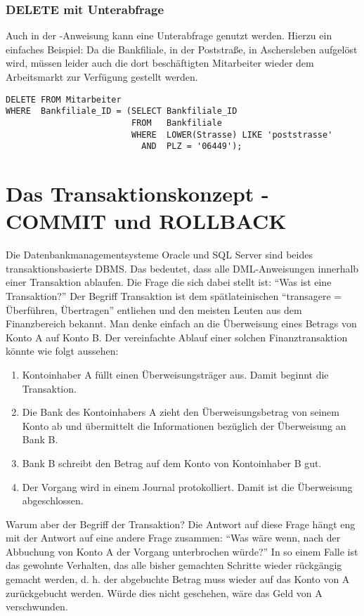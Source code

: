         \subsubsection{DELETE mit Unterabfrage}
         Auch in der \DELETE-Anweisung kann eine Unterabfrage genutzt werden.
         Hierzu ein einfaches Beispiel: Da die Bankfiliale, in der
         Poststraße, in Aschersleben aufgelöst wird, müssen leider auch
         die dort beschäftigten Mitarbeiter wieder dem Arbeitsmarkt zur
         Verfügung gestellt werden.
          \begin{lstlisting}[language=oracle_sql,caption={\DELETE{} mit Unterabfrage},label=sql07_22]
DELETE FROM Mitarbeiter
WHERE  Bankfiliale_ID = (SELECT Bankfiliale_ID
                         FROM   Bankfiliale
                         WHERE  LOWER(Strasse) LIKE 'poststrasse'
                           AND  PLZ = '06449');
          \end{lstlisting}
    \section{Das Transaktionskonzept - COMMIT und ROLLBACK}
      Die Datenbankmanagementsysteme Oracle und SQL Server sind beides
      transaktionsbasierte DBMS. Das bedeutet, dass alle DML-Anweisungen
      innerhalb einer Transaktion ablaufen. Die Frage die sich dabei stellt ist:
      \enquote{Was ist eine Transaktion?} Der Begriff Transaktion ist dem
      spätlateinischen \enquote{transagere = Überführen, Übertragen}
      entliehen und den meisten Leuten aus dem Finanzbereich bekannt. Man denke
      einfach an die Überweisung eines Betrags von Konto A auf Konto B. Der
      vereinfachte Ablauf einer solchen Finanztransaktion könnte wie folgt
      aussehen:
      \begin{enumerate}
        \item Kontoinhaber A füllt einen Überweisungsträger aus. Damit
        beginnt die Transaktion.
        \item Die Bank des Kontoinhabers A zieht den Überweisungsbetrag von
        seinem Konto ab und übermittelt die Informationen bezüglich der
        Überweisung an Bank B.
        \item Bank B schreibt den Betrag auf dem Konto von Kontoinhaber B gut.
        \item Der Vorgang wird in einem Journal protokolliert. Damit ist die
        Überweisung abgeschlossen.
      \end{enumerate}
      Warum aber der Begriff der Transaktion? Die Antwort auf diese Frage
      hängt eng mit der Antwort auf eine andere Frage zusammen: \enquote{Was
      wäre wenn, nach der Abbuchung von Konto A der Vorgang unterbrochen
      würde?} In so einem Falle ist das gewohnte Verhalten, das alle bisher
      gemachten Schritte wieder rückgängig gemacht werden, d. h. der
      abgebuchte Betrag muss wieder auf das Konto von A zurückgebucht werden.
      Würde dies nicht geschehen, wäre das Geld von A verschwunden.


